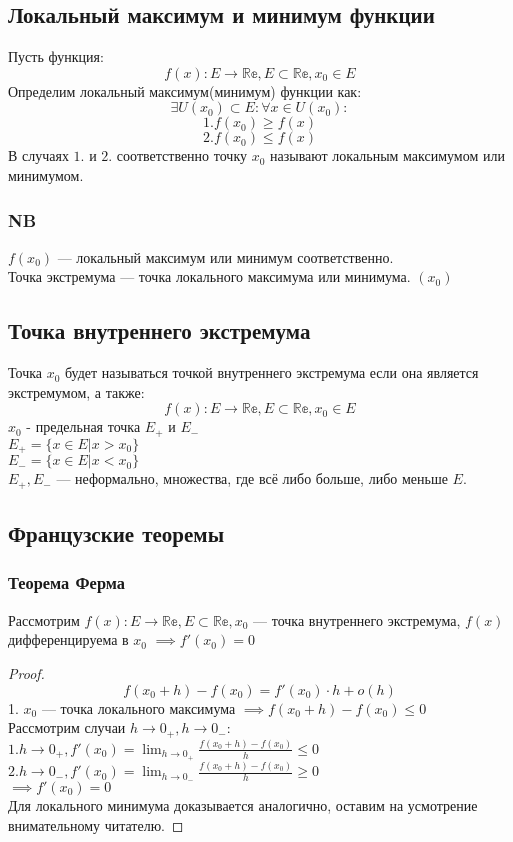 \subsection{Локальный максимум и минимум функции}
Пусть функция:
\[
    f(x): E \to \mathbb{Re}, E \subset \mathbb{Re}, x_0 \in E
\]
Определим локальный максимум(минимум) функции как:
\[
    \exists U(x_0) \subset E: \forall x \in U(x_0):
\]
\[
   1. f(x_0) \ge f(x) 
\]
\[
   2. f(x_0) \le f(x)
\]
В случаях $1.$ и $2.$ соответственно точку $x_0$ называют локальным максимумом или минимумом.

\subsubsection*{NB}
$f(x_0)$ --- локальный максимум или минимум соответственно.\\
Точка экстремума --- точка локального максимума или минимума. $(x_0)$

\subsection{Точка внутреннего экстремума}
Точка $x_0$ будет называться точкой внутреннего экстремума если она является экстремумом, а также:
\[
    f(x): E \to \mathbb{Re}, E \subset \mathbb{Re}, x_0 \in E
\]
$x_0$ - предельная точка $E_+$ и $E_-$\\
\( E_+ = \{x \in E | x > x_0\} \)\\
\( E_- = \{x \in E | x < x_0\} \)\\
$E_+, E_-$ --- неформально, множества, где всё либо больше, либо меньше $E$.


\subsection{Французские теоремы}

\subsubsection{Теорема Ферма}
Рассмотрим \(f(x): E \to \mathbb{Re}, E \subset \mathbb{Re}, x_0\) --- точка внутреннего экстремума,
$f(x)$ дифференцируема в $x_0$ \( \implies f'(x_0) = 0 \)
\begin{proof}
    \[ f(x_0 + h) - f(x_0) = f'(x_0)\cdot h + o(h)\]
    1. \(x_0 \text{ --- точка локального максимума } \implies f(x_0+h) - f(x_0) \le 0 \)\\
    Рассмотрим случаи \(h \to 0_+, h \to 0_-\):\\
    \(1. h \to 0_+, f'(x_0) = \lim_{h \to 0_+} \frac{f(x_0 + h) - f(x_0)}{h} \le 0 \)\\
    \(2. h \to 0_-, f'(x_0) = \lim_{h \to 0_-} \frac{f(x_0 + h) - f(x_0)}{h} \ge 0 \)\\
    \(\implies f'(x_0) = 0\)\\
    Для локального минимума доказывается аналогично, оставим на усмотрение внимательному читателю.
\end{proof}
